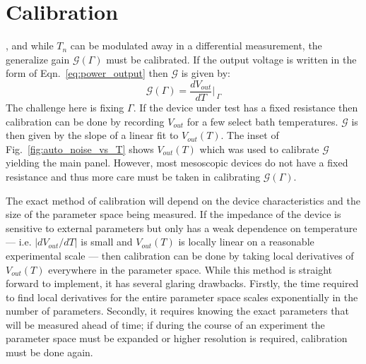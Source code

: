 \section{Calibration}
\label{section:calibration}
, and while $T_n$ can be modulated away in a differential measurement, the generalize gain $\mathcal{G}(\Gamma)$ must be calibrated. If the output voltage is written in the form of Eqn.~\ref{eq:power_output} then $\mathcal{G}$ is given by:
\begin{equation}
\mathcal{G}(\Gamma) = \frac{dV_{out}}{dT}\bigg\rvert_{~\Gamma}
\end{equation}
The challenge here is fixing $\Gamma$. If the device under test has a fixed resistance then calibration can be done by recording $V_{out}$ for a few select bath temperatures. $\mathcal{G}$ is then given by the slope of a linear fit to $V_{out}(T)$. The inset of Fig.~\ref{fig:auto_noise_vs_T} shows $V_{out}(T)$ which was used to calibrate $\mathcal{G}$ yielding the main panel. However, most mesoscopic devices do not have a fixed resistance and thus more care must be taken in calibrating $\mathcal{G}(\Gamma)$.

The exact method of calibration will depend on the device characteristics and the size of the parameter space being measured. If the impedance of the device is sensitive to external parameters but only has a weak dependence on temperature --- i.e. $|dV_{out}/dT|$ is small and $V_{out}(T)$ is locally linear on a reasonable experimental scale --- then calibration can be done by taking local derivatives of $V_{out}(T)$ everywhere in the parameter space. While this method is straight forward to implement, it has several glaring drawbacks. Firstly, the time required to find local derivatives for the entire parameter space scales exponentially in the number of parameters. Secondly, it requires knowing the exact parameters that will be measured ahead of time; if during the course of an experiment the parameter space must be expanded or higher resolution is required, calibration must be done again.

